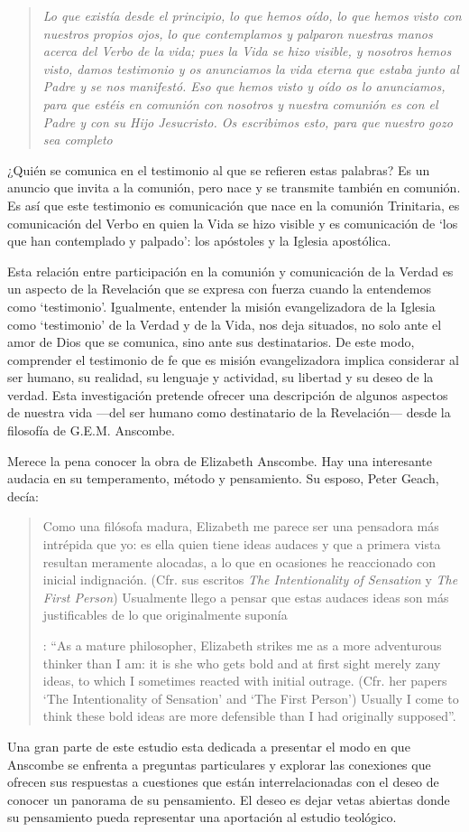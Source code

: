 \blockquote[][\,(1 Jn 1-4)]{\emph{Lo que existía desde el principio, lo que hemos oído, lo que hemos visto con nuestros propios ojos, lo que contemplamos y palparon nuestras manos acerca del Verbo de la vida; pues la Vida se hizo visible, y nosotros hemos visto, damos testimonio y os anunciamos la vida eterna que estaba junto al Padre y se nos manifestó. Eso que hemos visto y oído os lo anunciamos, para que estéis en comunión con nosotros y nuestra comunión es con el Padre y con su Hijo Jesucristo. Os escribimos esto, para que nuestro gozo sea completo}}. ¿Quién se comunica en el testimonio al que se refieren estas palabras? Es un anuncio que invita a la comunión, pero nace y se transmite también en comunión. Es así que este testimonio es comunicación que nace en la comunión Trinitaria, es comunicación del Verbo en quien la Vida se hizo visible y es comunicación de \enquote*{los que han contemplado y palpado}: los apóstoles y la Iglesia apostólica.

Esta relación entre participación en la comunión y comunicación de la Verdad es un aspecto de la Revelación que se expresa con fuerza cuando la entendemos como `testimonio'. Igualmente, entender la misión evangelizadora de la Iglesia como `testimonio' de la Verdad y de la Vida, nos deja situados, no solo ante el amor de Dios que se comunica, sino ante sus destinatarios. De este modo, comprender el testimonio de fe que es misión evangelizadora implica considerar al ser humano, su realidad, su lenguaje y actividad, su libertad y su deseo de la verdad. Esta investigación pretende ofrecer una descripción de algunos aspectos de nuestra vida ---del ser humano como destinatario de la Revelación--- desde la filosofía de G.E.M. Anscombe.

Merece la pena conocer la obra de Elizabeth Anscombe. Hay una interesante audacia en su temperamento, método y pensamiento. Su esposo, Peter Geach, decía: \blockquote[{\Cite[11]{geach1991philaut}}: \enquote{As a mature philosopher, Elizabeth strikes me as a more adventurous thinker than I am: it is she who gets bold and at first sight merely zany ideas, to which I sometimes reacted with initial outrage. (Cfr. her papers `The Intentionality of Sensation' and `The First Person') Usually I come to think these bold ideas are more defensible than I had originally supposed}.]{Como una filósofa madura, Elizabeth me parece ser una pensadora más intrépida que yo: es ella quien tiene ideas audaces y que a primera vista resultan meramente alocadas, a lo que en ocasiones he reaccionado con inicial indignación. (Cfr. sus escritos \emph{The Intentionality of Sensation} y \emph{The First Person}) Usualmente llego a pensar que estas audaces ideas son más justificables de lo que originalmente suponía}. Una gran parte de este estudio esta dedicada a presentar el modo en que Anscombe se enfrenta a preguntas particulares y explorar las conexiones que ofrecen sus respuestas a cuestiones que están interrelacionadas con el deseo de conocer un panorama de su pensamiento. El deseo es dejar vetas abiertas donde su pensamiento pueda representar una aportación al estudio teológico.

